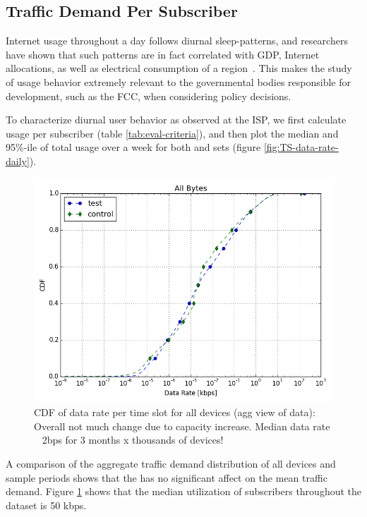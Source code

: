 \subsection{Traffic Demand Per Subscriber}\label{subsec:behavior}

Internet usage throughout a day follows diurnal sleep-patterns, and researchers
have shown that such patterns are in fact correlated with GDP, Internet 
allocations, as well as electrical consumption of 
a region~\cite{ant-diurnal-web}. This makes the study of usage behavior 
extremely relevant to the governmental bodies responsible
for development, such as the FCC, when considering policy decisions.

To characterize diurnal user behavior as observed at the ISP, we first calculate
usage per subscriber (table \ref{tab:eval-criteria}), and then plot the median 
and 95\%-ile of total usage over a week for both \treatment{} and \control{}
sets (figure \ref{fig:TS-data-rate-daily}).

\begin{figure}[ht]
\centering
\includegraphics[width=0.90\linewidth]{figures/cdf-all-bytes.png}
  \caption{CDF of data rate per time slot for all devices (agg view of data): 
Overall not much change due to capacity increase. Median data rate ~ 2bps for 3 
months x thousands of devices!}
  \label{fig:CDF-data-rate-all}
\end{figure}

A comparison of the aggregate traffic demand distribution of all devices and sample periods shows
that the \treatment{} has no significant affect on the mean traffic demand. Figure \ref{fig:CDF-data-rate-all}
shows that the median utilization of subscribers throughout the dataset is 50 kbps. 


